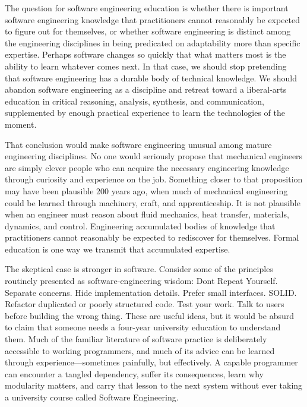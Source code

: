 
The question for software engineering education is whether there is important software engineering knowledge that practitioners cannot reasonably be expected to figure out for themselves, or whether software engineering is distinct among the engineering disciplines in being predicated on adaptability more than specific expertise. Perhaps software changes so quickly that what matters most is the ability to learn whatever comes next. In that case, we should stop pretending that software engineering has a durable body of technical knowledge. We should abandon software engineering as a discipline and retreat toward a liberal-arts education in critical reasoning, analysis, synthesis, and communication, supplemented by enough practical experience to learn the technologies of the moment.


That conclusion would make software engineering unusual among mature engineering disciplines. No one would seriously propose that mechanical engineers are simply clever people who can acquire the necessary engineering knowledge through curiosity and experience on the job. Something closer to that proposition may have been plausible 200 years ago, when much of mechanical engineering could be learned through machinery, craft, and apprenticeship. It is not plausible when an engineer must reason about fluid mechanics, heat transfer, materials, dynamics, and control. Engineering accumulated bodies of knowledge that practitioners cannot reasonably be expected to rediscover for themselves. Formal education is one way we transmit that accumulated expertise.


The skeptical case is stronger in software. Consider some of the principles routinely presented as software-engineering wisdom: Don\textquotesingle t Repeat Yourself. Separate concerns. Hide implementation details. Prefer small interfaces. SOLID. Refactor duplicated or poorly structured code. Test your work. Talk to users before building the wrong thing. These are useful ideas, but it would be absurd to claim that someone needs a four-year university education to understand them. Much of the familiar literature of software practice is deliberately accessible to working programmers, and much of its advice can be learned through experience---sometimes painfully, but effectively. A capable programmer can encounter a tangled dependency, suffer its consequences, learn why modularity matters, and carry that lesson to the next system without ever taking a university course called Software Engineering.

